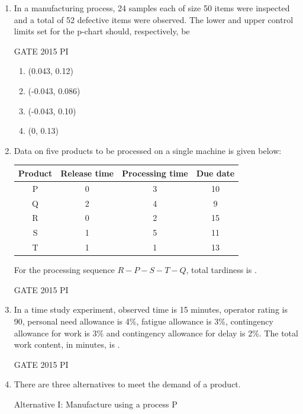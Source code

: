 \documentclass[journal,12pt,onecolumn]{IEEEtran}
\theoremstyle{remark}
\begin{document}
\begin{enumerate}
\item In a manufacturing process, 24 samples each of size 50 items were inspected and a total of 52 defective items were observed. The lower and upper control limits set for the p-chart should, respectively, be

\hfill{GATE 2015 PI}

\begin{multicols}{2}
\begin{enumerate}
    \item (0.043, 0.12)
    \item (-0.043, 0.086)
    \item (-0.043, 0.10)
    \item (0, 0.13)
\end{enumerate}
\end{multicols}
\item Data on five products to be processed on a single machine is given below:

\begin{center}
\begin{tabular}{|c|c|c|c|}
\hline
Product & Release time & Processing time & Due date \\
\hline
P & 0 & 3 & 10 \\
Q & 2 & 4 & 9 \\
R & 0 & 2 & 15 \\
S & 1 & 5 & 11 \\
T & 1 & 1 & 13 \\
\hline
\end{tabular}
\end{center}

For the processing sequence $R - P - S - T - Q$, total tardiness is \underline{\hspace{2cm}}. 

\hfill{GATE 2015 PI}

\item In a time study experiment, observed time is 15 minutes, operator rating is 90, personal need allowance is 4\%, fatigue allowance is 3\%, contingency allowance for work is 3\% and contingency allowance for delay is 2\%. The total work content, in minutes, is \underline{\hspace{2cm}}. 

\hfill{GATE 2015 PI}


\item 
There are three alternatives to meet the demand of a product.

Alternative I: Manufacture using a process P


\end{enumerate}
\end{document}
